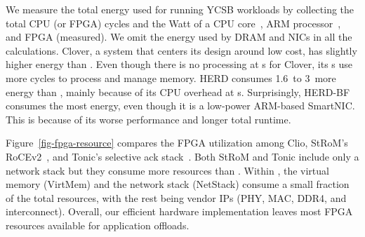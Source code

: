 We measure the total energy used for running YCSB workloads
by collecting the total CPU (or FPGA) cycles and the Watt of a CPU core~\cite{gold5128}, ARM processor~\cite{armpower}, and FPGA (measured).
We omit the energy used by DRAM and NICs in all the calculations. 
Clover, a system that centers its design around low cost, has slightly higher energy than \sys.
Even though there is no processing at \MN{}s for Clover, its \CN{}s use more cycles to process and manage memory.
HERD consumes 1.6\x\ to 3\x\ more energy than \sys, mainly because of its CPU overhead at \MN{}s.
Surprisingly, HERD-BF consumes the most energy, even though it is a low-power ARM-based SmartNIC.
This is because of its worse performance and longer total runtime.

Figure~\ref{fig-fpga-resource} compares the FPGA utilization among Clio, StRoM's RoCEv2~\cite{StRoM}, and Tonic's selective ack stack~\cite{TONIC}.
Both StRoM and Tonic include only a network stack but they consume more resources than \sys.
Within \sys, the virtual memory (VirtMem) and
the network stack (NetStack) consume a small fraction of the total resources,
with the rest being vendor IPs (PHY, MAC, DDR4, and interconnect).
Overall, our efficient hardware implementation leaves most FPGA resources available for application offloads.

